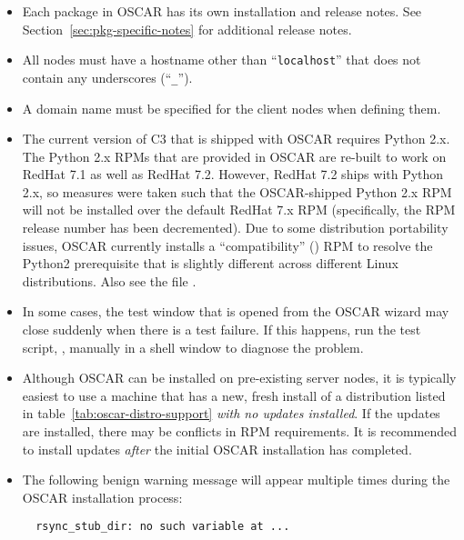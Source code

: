 \begin{itemize}
\item Each package in OSCAR has its own installation and release
  notes.  See Section~\ref{sec:pkg-specific-notes} for additional
  release notes.

\item All nodes must have a hostname other than ``{\tt localhost}''
  that does not contain any underscores (``{\tt \_}'').
  
\item A domain name must be specified for the client nodes when
  defining them.
  
\item The current version of C3 that is shipped with OSCAR requires
  Python 2.x.  The Python 2.x RPMs that are provided in OSCAR are
  re-built to work on RedHat 7.1 as well as RedHat 7.2.  However,
  RedHat 7.2 ships with Python 2.x, so measures were taken such that
  the OSCAR-shipped Python 2.x RPM will not be installed over the
  default RedHat 7.x RPM (specifically, the RPM release number has
  been decremented).  Due to some distribution portability issues,
  OSCAR currently installs a ``compatibility''
  () RPM to resolve the Python2
  prerequisite that is slightly different across different Linux
  distributions.  Also see the file
  .

\item In some cases, the test window that is opened from the 
  OSCAR wizard may close suddenly when there is a test failure. If
  this happens, run the test script, ,
  manually in a shell window to diagnose the problem.
  
\item Although OSCAR can be installed on pre-existing server nodes, it
  is typically easiest to use a machine that has a new, fresh install
  of a distribution listed in table~\ref{tab:oscar-distro-support}
  {\em with no updates installed}.  If the updates are installed,
  there may be conflicts in RPM requirements.  It is recommended to
  install updates {\em after} the initial OSCAR installation has
  completed.
  
\item The following benign warning message will appear multiple times
  during the OSCAR installation process:

\begin{verbatim}
  rsync_stub_dir: no such variable at ...
\end{verbatim}


\end{itemize}

